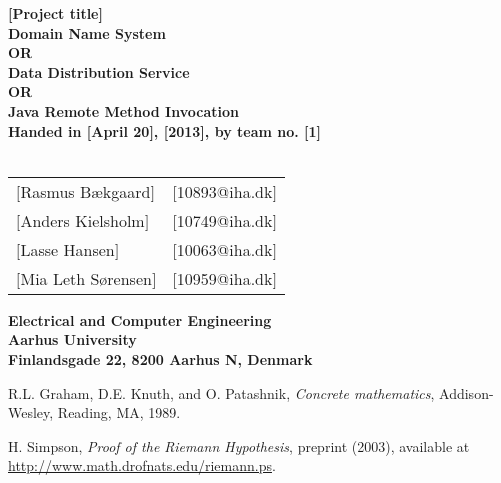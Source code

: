\documentclass[a4paper,10pt]{report}
\begin{document}
\begin{titlepage}
\begin{center}
{\LARGE \textbf{[Project title]}}\\
{\large \textbf{Domain Name System\\ OR\\ Data Distribution Service\\ OR\\ Java Remote Method Invocation}}\\


\vspace{4cm}
\textbf{Handed in [April 20], [2013], by team no. [1]}\\~\\
\begin{tabular}{ll}
$[$Rasmus Bækgaard$]$  & $[$10893@iha.dk$]$ \\
$[$Anders Kielsholm$]$  & $[$10749@iha.dk$]$ \\
$[$Lasse Hansen$]$  & $[$10063@iha.dk$]$ \\
$[$Mia Leth Sørensen$]$  & $[$10959@iha.dk$]$ \\
\end{tabular}
\vfill
\textbf{Electrical and Computer Engineering}\\
\textbf{Aarhus University}\\
\textbf{Finlandsgade 22, 8200 Aarhus N, Denmark}
\end{center}
\end{titlepage}












\begin{thebibliography}{9}

R.L. Graham, D.E. Knuth, and O. Patashnik, \emph{Concrete
mathematics}, Addison-Wesley, Reading, MA, 1989.

 H. Simpson, \emph{Proof of the Riemann
Hypothesis},  preprint (2003), available at 
\url{http://www.math.drofnats.edu/riemann.ps}.

\end{thebibliography}
\end{document}
